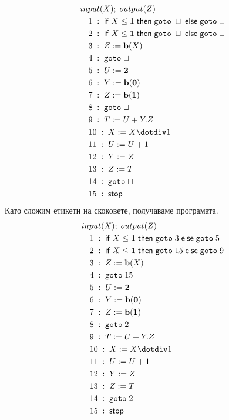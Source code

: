 \documentclass[14pt]{extarticle}
\begin{document}
\begin{align*}
    & input(X); \; output(Z) \\
    & \quad 1 \; : \; \mathsf{if} \; X \;\mathbf{\leq}\; \mathbf 1 \; \mathsf{then} \; \mathtt{goto} \; \sqcup  \; \mathsf{else} \; \mathtt{goto} \; \sqcup \\
    & \quad 2 \; : \; \mathsf{if} \; X \;\mathbf{\leq}\; \mathbf 1 \; \mathsf{then} \; \mathtt{goto} \; \sqcup  \; \mathsf{else} \; \mathtt{goto} \; \sqcup \\
    & \quad 3 \; : \; Z := \mathbf{b}(X) \\
    & \quad 4 \; : \; \mathtt{goto} \; \sqcup \\
    & \quad 5 \; : \; U := \mathbf 2 \\
    & \quad 6 \; : \; Y := \mathbf{b}(\mathbf 0) \\
    & \quad 7 \; : \; Z := \mathbf{b}(\mathbf 1) \\
    & \quad 8 \; : \; \mathtt{goto} \; \sqcup \\
    & \quad 9 \; : \; T := U + Y.Z \\
    & \quad 10 \; : \; X := X \dotdiv 1 \\
    & \quad 11 \; : \; U := U + 1 \\
    & \quad 12 \; : \; Y := Z \\
    & \quad 13 \; : \; Z := T \\
    & \quad 14 \; : \; \mathtt{goto} \; \sqcup \\
    & \quad 15 \; : \; \mathsf{stop}
\end{align*}
Като сложим етикети на скоковете, получаваме програмата.
\begin{align*}
    & input(X); \; output(Z) \\
    & \quad 1 \; : \; \mathsf{if} \; X \;\mathbf{\leq}\; \mathbf 1 \; \mathsf{then} \; \mathtt{goto} \; 3  \; \mathsf{else} \; \mathtt{goto} \; 5 \\
    & \quad 2 \; : \; \mathsf{if} \; X \;\mathbf{\leq}\; \mathbf 1 \; \mathsf{then} \; \mathtt{goto} \; 15  \; \mathsf{else} \; \mathtt{goto} \; 9 \\
    & \quad 3 \; : \; Z := \mathbf{b}(X) \\
    & \quad 4 \; : \; \mathtt{goto} \; 15 \\
    & \quad 5 \; : \; U := \mathbf 2 \\
    & \quad 6 \; : \; Y := \mathbf{b}(\mathbf 0) \\
    & \quad 7 \; : \; Z := \mathbf{b}(\mathbf 1) \\
    & \quad 8 \; : \; \mathtt{goto} \; 2 \\
    & \quad 9 \; : \; T := U + Y.Z \\
    & \quad 10 \; : \; X := X \dotdiv 1 \\
    & \quad 11 \; : \; U := U + 1 \\
    & \quad 12 \; : \; Y := Z \\
    & \quad 13 \; : \; Z := T \\
    & \quad 14 \; : \; \mathtt{goto} \; 2 \\
    & \quad 15 \; : \; \mathsf{stop}
\end{align*}
\end{document}

